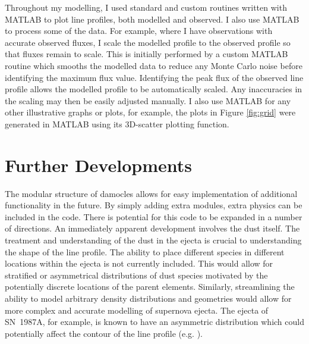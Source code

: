 Throughout my modelling, I used standard and custom routines written with MATLAB to plot line profiles, both modelled and observed.  I also use MATLAB to process some of the data.  For example, where I have observations with accurate observed fluxes, I scale the modelled profile to the observed profile so that fluxes remain to scale.  This is initially performed by a custom MATLAB routine which smooths the modelled data to reduce any Monte Carlo noise before identifying the maximum flux value.  Identifying the peak flux of the observed line profile allows the modelled profile to be automatically scaled.  Any inaccuracies in the scaling may then be easily adjusted manually.  I also use MATLAB for any other illustrative graphs or plots, for example, the plots in Figure \ref{fig:grid} were generated in MATLAB using its 3D-scatter plotting function.

\section{Further Developments}
\label{limitations}

The modular structure of {\sc damocles} allows for easy implementation of additional functionality in the future.  By simply adding extra modules, extra physics can be included in the code.  There is potential for this code to be expanded in a number of directions.  An immediately apparent development involves the dust itself.  The treatment and understanding of the dust in the ejecta is crucial to understanding the shape of the line profile.  The ability to place different species in different locations within the ejecta is not currently included.  This would allow for stratified or asymmetrical distributions of dust species motivated by the potentially discrete locations of the parent elements.  Similarly, streamlining the ability to model arbitrary density distributions and geometries would allow for more complex and accurate modelling of supernova ejecta.  The ejecta of SN~1987A, for example, is known to have an asymmetric distribution which could potentially affect the contour of the line profile (e.g. \citet{Sinnott2013}).

